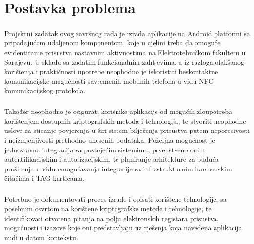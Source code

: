 \chapter{Postavka problema}
\paragraph*{}
Projektni zadatak ovog završnog rada je izrada aplikacije na Android platformi sa pripadajućom udaljenom komponentom, koje u cjelini treba da omoguće evidentiranje prisustva nastavnim aktivnostima na Elektrotehničkom fakultetu u Sarajevu. U skladu sa zadatim funkcionalnim zahtjevima, a iz razloga olakšanog korištenja i praktičnosti upotrebe neophodno je iskoristiti beskontaktne komunikacijske mogućnosti savremenih mobilnih telefona u vidu NFC komunikacijskog protokola.
\paragraph*{}
Također neophodno je osigurati korisnike aplikacije od mogućih zloupotreba korištenjem dostupnih kriptografskih metoda i tehnologija, te stvoriti neophodne uslove za sticanje povjerenja u širi sistem bilježenja prisustva putem neporecivosti i neizmjenjivosti prethodno unesenih podataka. Poželjna mogućnost je jednostavna integracija sa postojećim sistemima, prvenstveno onim autentifikacijskim i autorizacijskim, te planiranje arhitekture za buduća proširenja u vidu omogućavanja integracije sa infrastrukturnim hardverskim čitačima i TAG karticama.
\paragraph*{}
Potrebno je dokumentovati proces izrade i opisati korištene tehnologije, sa posebnim osvrtom na korištene kriptografske metode i tehnologije, te identifikovati otvorena pitanja na polju elektronskih registara prisustva, mogućnosti i izazove koje oni predstavljaju uz rješenja koja navedena aplikacija nudi u datom kontekstu.